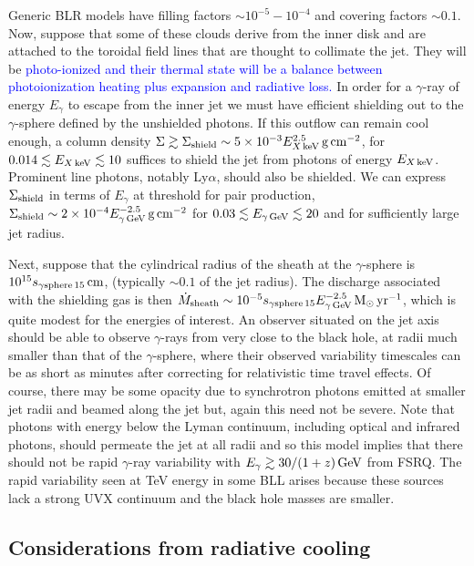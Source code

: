 \documentclass[twocolumn,linenumbers]{aastex62}
\newcommand{\gray}{$\gamma$-ray\xspace}
\newcommand{\response}[1]{\textcolor{blue}{#1}}
\begin{document}
Generic BLR models have filling factors $\sim10^{-5}-10^{-4}$ and covering factors $\sim0.1$. Now, suppose that some of these clouds derive from the inner disk and are attached to the toroidal field lines that are thought to collimate the jet. They will be
\response{
photo-ionized
and their thermal state will be a balance between photoionization heating plus expansion and radiative loss.
}
In order for a \gray of energy $E_\gamma$ to escape from the inner jet we must have efficient shielding out to the $\gamma$-sphere  \citep{1995ApJ...441...79B} defined by the unshielded photons. If this outflow can remain cool enough, a column density $\Sigma\gtrsim\Sigma_{\rm shield}\sim5\times10^{-3}E_{X\,\rm keV}^{2.5}\,{\rm g\,cm}^{-2}$, for $0.014\lesssim E_{X\,\rm keV}\lesssim10$ suffices to shield the jet from photons of energy $E_{X\,\rm keV}$. Prominent line photons, notably Ly$\alpha$, should also be shielded. We can express $\Sigma_{\rm shield}$ in terms of $E_\gamma$ at threshold for pair production, $\Sigma_{\rm shield}\sim2\times10^{-4}E_{\gamma\,\rm GeV}^{-2.5}\,{\rm g\,cm}^{-2}$ for $0.03\lesssim E_{\gamma\,{\rm GeV}}\lesssim20$ and for sufficiently large jet radius. 

Next, suppose that the cylindrical radius of the sheath at the $\gamma$-sphere is $10^{15}s_{\gamma{\rm sphere}\,15}\,{\rm cm}$, (typically $\sim0.1$ of the jet radius). The discharge associated with the shielding gas is then $\dot M_{\rm sheath}\sim10^{-5}s_{\gamma{\rm sphere}\,15}E_{\gamma\,\rm GeV}^{-2.5}\,{\rm M}_\odot\,{\rm yr}^{-1}$, which is quite modest for the energies of interest. An observer situated on the jet axis should be able to observe $\gamma$-rays from very close to the black hole, at radii much smaller than that of the $\gamma$-sphere, where their observed variability timescales can be as short as minutes after correcting for relativistic time travel effects. Of course, there may be some opacity due to synchrotron photons emitted at smaller jet radii and beamed along the jet but, again this need not be severe. Note that photons with energy below the Lyman continuum, including optical and infrared photons, should permeate the jet at all radii and so this model implies that there should not be rapid \gray variability with $E_{\gamma}\gtrsim30/(1+z)\,{\rm GeV}$ from FSRQ. The rapid variability seen  at TeV energy in some BLL arises because
these sources lack a strong UVX continuum and the black hole masses are smaller.

\subsection{Considerations from radiative cooling}
\label{sec:tcool}
\end{document}
